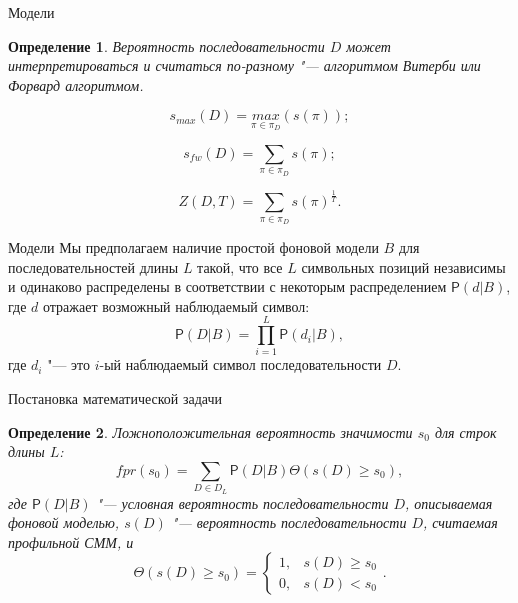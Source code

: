 \documentclass{beamer}
\newtheorem{defenition}{Определение}
\begin{document}
	\begin{frame}{Модели}
		\begin{defenition}
			\textit{Вероятность последовательности} $D$ может интерпретироваться и считаться по-разному "--- алгоритмом \textit{Витерби} или \textit{Форвард} алгоритмом.
		\end{defenition}
		
		\begin{equation*}
			s_{max}(D) = \underset{\pi \in \pi_{D}}{max}(s(\pi)); \label{eq:1}
		\end{equation*}
	
		\begin{equation*}
			s_{fw}(D) = \sum_{\pi \in \pi_{D}}s(\pi); \label{eq:2}
		\end{equation*}
	
		\begin{equation*}
			Z(D, T)	= \sum_{\pi \in \pi_{D}}s(\pi)^{\frac{1}{T}}. \label{eq:3}
		\end{equation*}
	\end{frame}	

	\begin{frame}{Модели}
		Мы предполагаем наличие простой фоновой модели $B$ для последовательностей длины $L$ такой, что все $L$ символьных позиций независимы и одинаково распределены в соответствии с некоторым распределением $\mathsf{P}(d|B)$, где $d$ отражает возможный наблюдаемый символ:
		\begin{equation*}
			\mathsf{P}(D|B) = \prod_{i=1}^{L}\mathsf{P}(d_{i}|B), \label{eq:4}
		\end{equation*}
		где $d_{i}$ "--- это $i$-ый наблюдаемый символ последовательности $D$.
	\end{frame}

	\begin{frame}{Постановка математической задачи}
		\begin{defenition}
			Ложноположительная вероятность значимости $s_{0}$ для строк длины $L$:	
			\begin{equation}
				fpr(s_{0}) =  \sum_{D \in D_{L}} \mathsf{P}(D|B) \Theta(s(D) \geq s_{0}), \label{eq:5}
			\end{equation}
			где $\mathsf{P}(D|B)$ "--- условная вероятность последовательности $D$, описываемая фоновой моделью, $s(D)$ "--- вероятность последовательности $D$, считаемая профильной СММ, и
			\[
			\Theta(s(D) \geq s_{0}) = 
			\begin{cases}
				1, & s(D) \geq s_{0}\\
				0, & s(D) < s_{0}
			\end{cases}.
			\]
		\end{defenition}		
	\end{frame}
	
\end{document}
